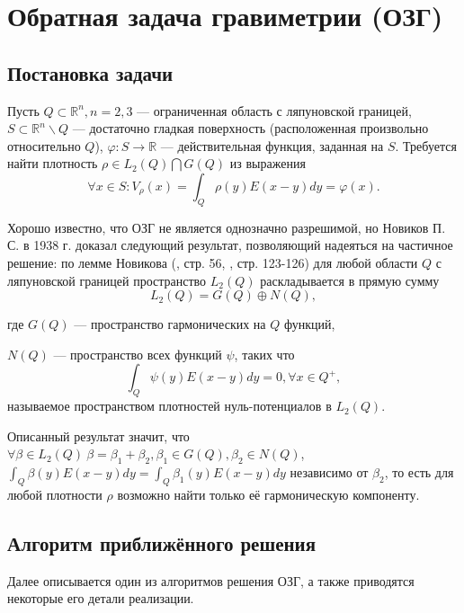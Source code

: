 \documentclass[a4paper]{article}
\newcommand{\V}[1]{\int_Q #1(y) E(x-y) dy}
\newcommand{\R}[1]{\mathbb{R}^#1}
\begin{document}
\FloatBarrier
\clearpage %
\section{Обратная задача гравиметрии (ОЗГ)}
\subsection{Постановка задачи}
Пусть $Q\subset \R{n}, n=2,3$ --- ограниченная область с ляпуновской границей,
$S \subset \R{n}\backslash Q$ --- достаточно гладкая поверхность (расположенная произвольно относительно $Q$), $\varphi: S \rightarrow \mathbb{R}$ --- действительная функция, заданная на $S$.
Требуется найти плотность $\rho \in L_2(Q) \bigcap G(Q)$ из выражения
\begin{equation}
  \forall x \in S: V_\rho(x)= \V{\rho}= \varphi(x).
\end{equation}

Хорошо известно, что ОЗГ не является однозначно разрешимой, но Новиков П. С. в 1938 г. доказал следующий результат, позволяющий надеяться на частичное решение:
по лемме Новикова (\cite{lezh}, стр. 56, \cite{nov}, стр. 123-126) для любой области $Q$ с ляпуновской границей пространство $L_2(Q)$ раскладывается в прямую сумму
\begin{equation}
  L_2(Q)= G(Q) \oplus N(Q),
\end{equation}

где $G(Q)$ --- пространство гармонических на $Q$ функций,

$N(Q)$ --- пространство всех функций $\psi$, таких что
\begin{equation}
  \V{\psi}=0, \forall x\in Q^+,
\end{equation}
называемое пространством плотностей нуль-потенциалов в $L_2(Q)$.

Описанный результат значит, что $\forall \beta \in L_2(Q) \ \beta = \beta_1 + \beta_2, \beta_1 \in G(Q), \beta_2 \in N(Q)$, $\V{\beta}=\V{\beta_1}$ независимо от $\beta_2$, то есть для любой плотности $\rho$ возможно найти только её гармоническую компоненту.


\subsection{Алгоритм приближённого решения}

Далее описывается один из алгоритмов решения ОЗГ, а также приводятся некоторые его детали реализации.
\end{document}
